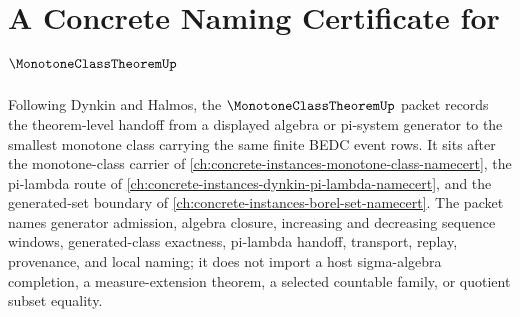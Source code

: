 \chapter{A Concrete Naming Certificate for $\MonotoneClassTheoremUp$}
\label{ch:concrete-instances-monotone-class-theorem-namecert}

Following Dynkin and Halmos, the $\MonotoneClassTheoremUp$ packet records the theorem-level handoff from a displayed algebra or pi-system generator to the smallest monotone class carrying the same finite BEDC event rows. It sits after the monotone-class carrier of \autoref{ch:concrete-instances-monotone-class-namecert}, the pi-lambda route of \autoref{ch:concrete-instances-dynkin-pi-lambda-namecert}, and the generated-set boundary of \autoref{ch:concrete-instances-borel-set-namecert}. The packet names generator admission, algebra closure, increasing and decreasing sequence windows, generated-class exactness, pi-lambda handoff, transport, replay, provenance, and local naming; it does not import a host sigma-algebra completion, a measure-extension theorem, a selected countable family, or quotient subset equality.

